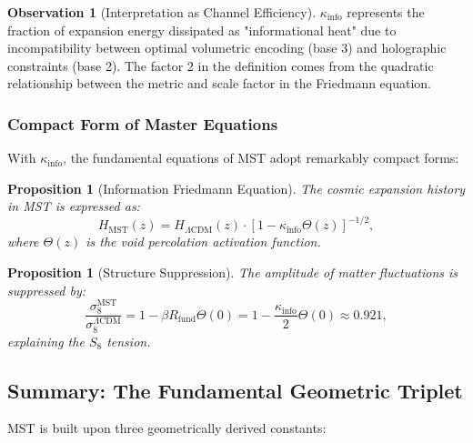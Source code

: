 \documentclass[11pt, a4paper]{article}
\theoremstyle{plain}
\newtheorem{proposition}[theorem]{Proposition}
\theoremstyle{definition}
\newtheorem{observation}[theorem]{Observation}
\newcommand{\Rfactor}{R_{\text{fund}}}
\newcommand{\Kinfo}{\kappa_{\text{info}}}
\begin{document}
\begin{observation}[Interpretation as Channel Efficiency]
$\Kinfo$ represents the fraction of expansion energy dissipated as "informational heat" due to incompatibility between optimal volumetric encoding (base 3) and holographic constraints (base 2). The factor 2 in the definition comes from the quadratic relationship between the metric and scale factor in the Friedmann equation.
\end{observation}

\subsubsection{Compact Form of Master Equations}

With $\Kinfo$, the fundamental equations of MST adopt remarkably compact forms:

\begin{proposition}[Information Friedmann Equation]
The cosmic expansion history in MST is expressed as:
\begin{equation}
H_{\text{MST}}(z) = H_{\Lambda\text{CDM}}(z) \cdot \left[1 - \Kinfo \Theta(z)\right]^{-1/2},
\label{eq:friedmann_info}
\end{equation}
where $\Theta(z)$ is the void percolation activation function.
\end{proposition}

\begin{proposition}[Structure Suppression]
The amplitude of matter fluctuations is suppressed by:
\begin{equation}
\frac{\sigma_8^{\text{MST}}}{\sigma_8^{\Lambda\text{CDM}}} = 1 - \beta\Rfactor \Theta(0) = 1 - \frac{\Kinfo}{2} \Theta(0) \approx 0.921,
\label{eq:suppression}
\end{equation}
explaining the $S_8$ tension.
\end{proposition}

\subsection{Summary: The Fundamental Geometric Triplet}

MST is built upon three geometrically derived constants:
\end{document}
